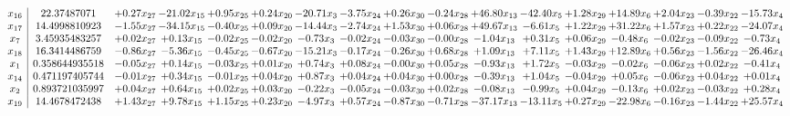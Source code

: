 \documentclass[9pt]{article}
\begin{document}
 \[\begin{array}{c| c c@{\hskip 2pt} c@{\hskip 2pt} c@{\hskip 2pt} c@{\hskip 2pt} c@{\hskip 2pt} c@{\hskip 2pt} c@{\hskip 2pt} c@{\hskip 2pt} c@{\hskip 2pt} c@{\hskip 2pt} c@{\hskip 2pt} c@{\hskip 2pt} c@{\hskip 2pt} c@{\hskip 2pt} c@{\hskip 2pt} }
 x_{16}   &  22.37487071 & +  0.27 x_{27} & -21.02 x_{15} & +  0.95 x_{25} & +  0.24 x_{20} & -20.71 x_{3} & -3.75 x_{24} & +  0.26 x_{30} & -0.24 x_{28} & + 46.80 x_{13} & -42.40 x_{5} & +  1.28 x_{29} & + 14.89 x_{6} & +  2.04 x_{23} & -0.39 x_{22} & -15.73 x_{4}\\
 x_{17}   &  14.4998810923 & -1.55 x_{27} & -34.15 x_{15} & -0.40 x_{25} & +  0.09 x_{20} & -14.44 x_{3} & -2.74 x_{24} & +  1.53 x_{30} & +  0.06 x_{28} & + 49.67 x_{13} & -6.61 x_{5} & +  1.22 x_{29} & + 31.22 x_{6} & +  1.57 x_{23} & +  0.22 x_{22} & -24.07 x_{4}\\
 x_{7}   &  3.45935483257 & +  0.02 x_{27} & +  0.13 x_{15} & -0.02 x_{25} & -0.02 x_{20} & -0.73 x_{3} & -0.02 x_{24} & -0.03 x_{30} & -0.00 x_{28} & -1.04 x_{13} & +  0.31 x_{5} & +  0.06 x_{29} & -0.48 x_{6} & -0.02 x_{23} & -0.09 x_{22} & -0.73 x_{4}\\
 x_{18}   &  16.3414486759 & -0.86 x_{27} & -5.36 x_{15} & -0.45 x_{25} & -0.67 x_{20} & -15.21 x_{3} & -0.17 x_{24} & -0.26 x_{30} & +  0.68 x_{28} & +  1.09 x_{13} & +  7.11 x_{5} & +  1.43 x_{29} & + 12.89 x_{6} & +  0.56 x_{23} & -1.56 x_{22} & -26.46 x_{4}\\
 x_{1}   &  0.358644935518 & -0.05 x_{27} & +  0.14 x_{15} & -0.03 x_{25} & +  0.01 x_{20} & +  0.74 x_{3} & +  0.08 x_{24} & -0.00 x_{30} & +  0.05 x_{28} & -0.93 x_{13} & +  1.72 x_{5} & -0.03 x_{29} & -0.02 x_{6} & -0.06 x_{23} & +  0.02 x_{22} & -0.41 x_{4}\\
 x_{14}   &  0.471197405744 & -0.01 x_{27} & +  0.34 x_{15} & -0.01 x_{25} & +  0.04 x_{20} & +  0.87 x_{3} & +  0.04 x_{24} & +  0.04 x_{30} & +  0.00 x_{28} & -0.39 x_{13} & +  1.04 x_{5} & -0.04 x_{29} & +  0.05 x_{6} & -0.06 x_{23} & +  0.04 x_{22} & +  0.01 x_{4}\\
 x_{2}   &  0.893721035997 & +  0.04 x_{27} & +  0.64 x_{15} & +  0.02 x_{25} & +  0.03 x_{20} & -0.22 x_{3} & -0.05 x_{24} & -0.03 x_{30} & +  0.02 x_{28} & -0.08 x_{13} & -0.99 x_{5} & +  0.04 x_{29} & -0.13 x_{6} & +  0.02 x_{23} & -0.03 x_{22} & +  0.28 x_{4}\\
 x_{19}   &  14.4678472438 & +  1.43 x_{27} & +  9.78 x_{15} & +  1.15 x_{25} & +  0.23 x_{20} & -4.97 x_{3} & +  0.57 x_{24} & -0.87 x_{30} & -0.71 x_{28} & -37.17 x_{13} & -13.11 x_{5} & +  0.27 x_{29} & -22.98 x_{6} & -0.16 x_{23} & -1.44 x_{22} & + 25.57 x_{4}\\

\end{array}\]
\end{document}
